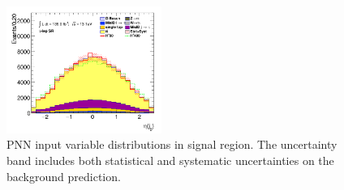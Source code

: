 \begin{figure}[!htp]
\begin{center}
			\includegraphics[width=0.45\textwidth]{chapters/chapter6_HPlus/images/taulep/jet_0_eta_SR_TAULEP.png} 
			\end{center}
			\caption{
			PNN input variable distributions in \taulep signal region. The uncertainty band includes both statistical and systematic uncertainties on the background prediction. 
			}
			\label{fig:sr-taulep-2}
		\end{figure}


